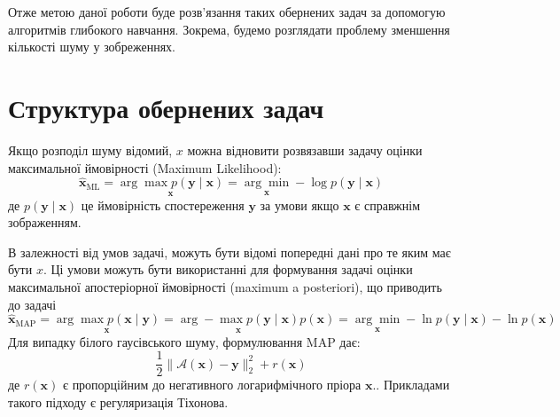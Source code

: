 \documentclass[14pt,a4paper]{extarticle}
\newcounter{e}
\numberwithin{equation}{section}
\numberwithin{figure}{section}
\begin{document}
	Отже метою даної роботи буде розв'язання таких обернених задач за допомогую алгоритмів глибокого навчання. Зокрема, будемо розглядати проблему зменшення кількості шуму у зобреженнях.

		
		
	\newpage
	\thispagestyle{empty}
	\section{Структура обернених задач}

	
	Якщо розподіл шуму відомий, $x$ можна відновити розвязавши задачу оцінки максимальної ймовірності (Maximum Likelihood):
	$$
	\hat{\boldsymbol{x}}_{\mathrm{ML}}
	=\underset{\boldsymbol{x}}{\arg \max{ p (\boldsymbol{y} \mid \boldsymbol{x}) }}
	=\underset{\boldsymbol{x}}{\arg \min }-\log p(\boldsymbol{y} \mid \boldsymbol{x})
	$$
	де $p(\boldsymbol{y} \mid \boldsymbol{x})$ це ймовірність спостереження $\boldsymbol{y}$ за умови якщо $\boldsymbol{x}$ є справжнім зображенням.
	
	В залежності від умов задачі, можуть бути відомі попередні дані про те яким має бути $x$. Ці умови можуть бути використанні для формування  задачі оцінки максимальної апостеріорної ймовірності (maximum a posteriori), що приводить до задачі
	$$
	\hat{\boldsymbol{x}}_{\mathrm{MAP}}
	=\underset{\boldsymbol{x}}{\arg \max{ p(\boldsymbol{x} \mid \boldsymbol{y}) }}
	=\underset{\boldsymbol{x}}{\arg -\max{ p(\boldsymbol{y} \mid \boldsymbol{x})} } p(\boldsymbol{x})
	=\underset{\boldsymbol{x}}{\arg \min }-\ln p(\boldsymbol{y} \mid \boldsymbol{x})-\ln p(\boldsymbol{x})
	$$
	Для випадку білого гаусівського шуму, формулювання MAP дає:
	\begin{equation}
	\label{MAP-avgn}
	 \frac{1}{2}\|\mathcal{A}(\boldsymbol{x})-\boldsymbol{y}\|_{2}^{2}+r(\boldsymbol{x})
	\end{equation}
	де  $r(\boldsymbol{x})$ є пропорційним до негативного логарифмічного пріора $\boldsymbol{x} .$. Прикладами такого підходу є регуляризація Тіхонова. 
	
\end{document}
